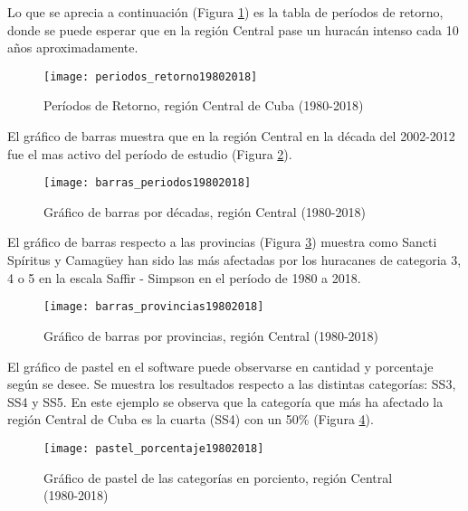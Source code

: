\pagebreak

Lo que se aprecia a continuación (Figura \ref{fig:periodos_retorno19802018}) es la tabla de períodos de retorno, donde se puede esperar que en la región Central pase un huracán intenso cada 10 años aproximadamente. %

\begin{figure}[H]
\centering
\texttt{[image: periodos\_retorno19802018]}
\caption{Períodos de Retorno, región Central de Cuba (1980-2018)}
\label{fig:periodos_retorno19802018}
\end{figure}


El gráﬁco de barras muestra que en la región Central en la década del 2002-2012 fue el mas activo del período de estudio (Figura \ref{fig:barras_periodos19802018}). %

\begin{figure}[H]
\centering
\texttt{[image: barras\_periodos19802018]}
\caption{Gráfico de barras por décadas, región Central (1980-2018)}
\label{fig:barras_periodos19802018}
\end{figure}

\pagebreak

El gráfico de barras respecto a las provincias (Figura \ref{fig:barras_provincias19802018}) muestra como Sancti Spíritus y Camagüey han sido las más afectadas por los huracanes de categoria 3, 4 o 5 en la escala Saffir - Simpson en el período de 1980 a 2018.

\begin{figure}[H]
\centering
\texttt{[image: barras\_provincias19802018]}
\caption{Gráfico de barras por provincias, región Central (1980-2018)}
\label{fig:barras_provincias19802018}
\end{figure}

\pagebreak

El gráﬁco de pastel en el software puede observarse en cantidad y porcentaje según se desee. Se muestra los resultados respecto a las distintas categorías: SS3, SS4 y  SS5. En este ejemplo se observa que la categoría que más ha afectado la región Central de Cuba es la cuarta (SS4) con un 50\% (Figura \ref{fig:pastel_porcentaje19802018}).%

\begin{figure}[H]
\centering
\texttt{[image: pastel\_porcentaje19802018]}
\caption{Gráfico de pastel de las categorías en porciento, región Central (1980-2018)}
\label{fig:pastel_porcentaje19802018}
\end{figure}
